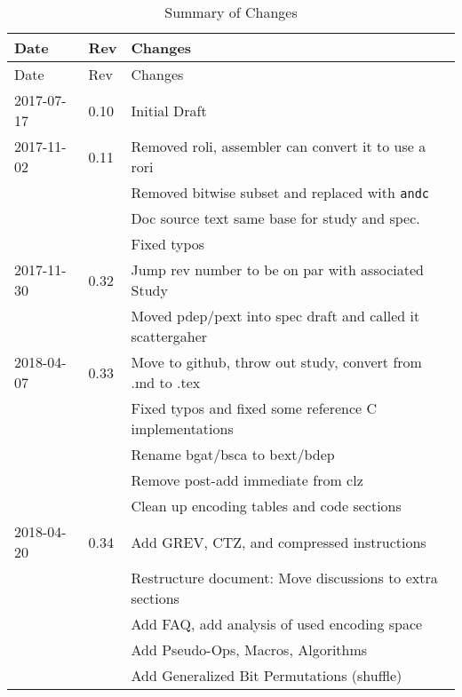 \documentclass[twoside,11pt]{book}
\begin{document}
\begin{longtable}[c]{@{}lll@{}}
\caption{Summary of Changes}\tabularnewline
\toprule
Date & Rev & Changes\tabularnewline
\midrule
\endfirsthead
\toprule
Date & Rev & Changes\tabularnewline
\midrule
\endhead
2017-07-17 & 0.10 & Initial Draft\tabularnewline
2017-11-02 & 0.11 & Removed roli, assembler can convert it to use a rori\tabularnewline
           &      & Removed bitwise subset and replaced with \texttt{andc}\tabularnewline
           &      & Doc source text same base for study and spec.\tabularnewline
           &      & Fixed typos\tabularnewline
2017-11-30 & 0.32 & Jump rev number to be on par with associated Study\tabularnewline
           &      & Moved pdep/pext into spec draft and called it scattergaher\tabularnewline
2018-04-07 & 0.33 & Move to github, throw out study, convert from .md to .tex\tabularnewline
           &      & Fixed typos and fixed some reference C implementations\tabularnewline
           &      & Rename bgat/bsca to bext/bdep\tabularnewline
           &      & Remove post-add immediate from clz\tabularnewline
           &      & Clean up encoding tables and code sections\tabularnewline
2018-04-20 & 0.34 & Add GREV, CTZ, and compressed instructions\tabularnewline
           &      & Restructure document: Move discussions to extra sections\tabularnewline
           &      & Add FAQ, add analysis of used encoding space\tabularnewline
           &      & Add Pseudo-Ops, Macros, Algorithms\tabularnewline
           &      & Add Generalized Bit Permutations (shuffle)\tabularnewline
\bottomrule
\end{longtable}

% 
% 
\end{document}
